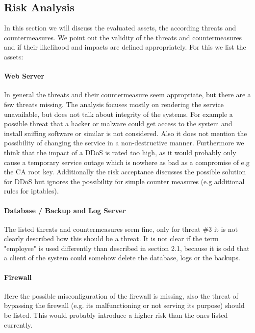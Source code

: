 \documentclass[english]{article}
\begin{document}

\subsection{Risk Analysis} %

%
%
In this section we will discuss the evaluated assets, the according threats and countermeasures. We point out the validity of the threats and countermeasures and if their likelihood and impacts are defined appropriately. For this we list the assets:

\paragraph{Web Server}
In general the threats and their countermeasure seem appropriate, but there are a few threats missing. The analysis focuses mostly on rendering the service unavailable, but does not talk about integrity of the systems. For example a possible threat that a hacker or malware could get access to the system and install sniffing software or similar is not considered. Also it does not mention the possibility of changing the service in a non-destructive manner.
Furthermore we think that the impact of a DDoS is rated too high, as it would probably only cause a temporary service outage which is nowhere as bad as a compromise of e.g the CA root key. Additionally the risk acceptance discusses the possible solution for DDoS but ignores the possibility for simple counter measures (e.g additional rules for iptables).

\paragraph{Database / Backup and Log Server}
The listed threats and countermeasures seem fine, only for threat \#3 it is not clearly described how this should be a threat. It is not clear if the term "employee" is used differently than described in section 2.1, because it is odd that a client of the system could somehow delete the database, logs or the backups.

\paragraph{Firewall}   
Here the possible misconfiguration of the firewall is missing, also the threat of bypassing the firewall (e.g. its malfunctioning or not serving its purpose) should be listed. This would probably introduce a higher risk than the ones listed currently.\\
\end{document}
